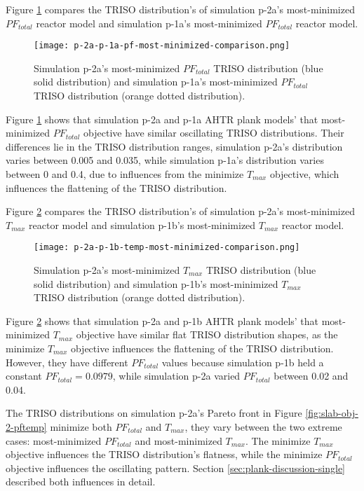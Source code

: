 Figure \ref{fig:p-2a-pf-triso-comparison} compares the TRISO distribution's of 
simulation p-2a's most-minimized $PF_{total}$ reactor model and simulation p-1a's 
most-minimized $PF_{total}$ reactor model. 
\begin{figure}[htbp!]
    \centering
    \texttt{[image: p-2a-p-1a-pf-most-minimized-comparison.png]} 
    \caption{Simulation p-2a's most-minimized $PF_{total}$ TRISO distribution (blue 
    solid distribution) and simulation p-1a's most-minimized $PF_{total}$ TRISO 
    distribution (orange dotted distribution).}
    \label{fig:p-2a-pf-triso-comparison}
\end{figure}
Figure \ref{fig:p-2a-pf-triso-comparison} shows that simulation p-2a and 
p-1a AHTR plank models' that most-minimized $PF_{total}$ objective have 
similar oscillating TRISO distributions. 
Their differences lie in the TRISO distribution ranges, simulation p-2a's 
distribution varies between 0.005 and 0.035, while simulation p-1a's 
distribution varies between 0 and 0.4, due to influences from the minimize $T_{max}$ 
objective, which influences the flattening of the TRISO distribution. 

Figure \ref{fig:p-2a-temp-triso-comparison} compares the TRISO distribution's of 
simulation p-2a's most-minimized $T_{max}$ reactor model and simulation p-1b's 
most-minimized $T_{max}$ reactor model. 
\begin{figure}[htbp!]
    \centering
    \texttt{[image: p-2a-p-1b-temp-most-minimized-comparison.png]} 
    \caption{Simulation p-2a's most-minimized $T_{max}$ TRISO distribution (blue 
    solid distribution) and simulation p-1b's most-minimized $T_{max}$ TRISO 
    distribution (orange dotted distribution).}
    \label{fig:p-2a-temp-triso-comparison}
\end{figure}
Figure \ref{fig:p-2a-temp-triso-comparison} shows that simulation p-2a and 
p-1b AHTR plank models' that most-minimized $T_{max}$ objective have 
similar flat TRISO distribution shapes, as the minimize $T_{max}$ objective
influences the flattening of the TRISO distribution.
However, they have different $PF_{total}$ values because simulation p-1b held a constant
$PF_{total} = 0.0979$, while simulation p-2a varied $PF_{total}$ between 0.02 and 0.04. 

The \gls{TRISO} distributions on simulation p-2a's Pareto front in Figure 
\ref{fig:slab-obj-2-pftemp} minimize both $PF_{total}$ and $T_{max}$, they vary 
between the two extreme cases: most-minimized $PF_{total}$ and most-minimized 
$T_{max}$. 
The minimize $T_{max}$ objective influences the TRISO distribution's flatness, while 
the minimize $PF_{total}$ objective influences the oscillating pattern.
Section \ref{sec:plank-discussion-single} described both influences in detail. 

